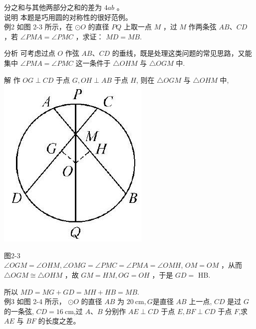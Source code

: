 \documentclass[10pt]{article}
\begin{document}
分之和与其他两部分之和的差为 $4 a b$ 。\\
说明 本题是巧用圆的对称性的很好范例。\\
例2 如图 2-3 所示，在 $\odot O$ 的直径 $P Q$ 上取一点 $M$ ，过 $M$ 作两条弦 $A B 、 C D$ ，若 $\angle P M A=\angle P M C$ ，求证： $M D=M B$.

分析 可考虑过点 $O$ 作弦 $A B 、 C D$ 的垂线，既是处理这类问题的常见思路，又能集中 $\angle P M A=\angle P M C$ 这一条件于 $\triangle O H M$ 与 $\triangle O G M$ 中.

解 作 $O G \perp C D$ 于点 $G, O H \perp A B$ 于点 $H$, 则在 $\triangle O G M$ 与 $\triangle O H M$ 中,\\
\includegraphics[max width=\textwidth, center]{2024_10_30_66b8e5e701da2093c133g-018}

图2-3\\
$\angle O G M=\angle O H M, \angle O M G=\angle P M C=\angle P M A=\angle O M H$, $O M=O M$ ，从而 $\triangle O G M \cong \triangle O H M$ ，故 $G M=H M, O G=O H$ ，于是 $G D=$ HB.

所以 $M D=M G+G D=M H+H B=M B$.\\
例3 如图 2-4 所示， $\odot O$ 的直径 $A B$ 为 $20 \mathrm{~cm}, G$是直径 $A B$ 上一点, $C D$ 是过 $G$ 的一条弦, $C D=16 \mathrm{~cm}$,过 $A 、 B$ 分别作 $A E \perp C D$ 于点 $E, B F \perp C D$ 于点 $F$,求 $A E$ 与 $B F$ 的长度之差。
\end{document}

